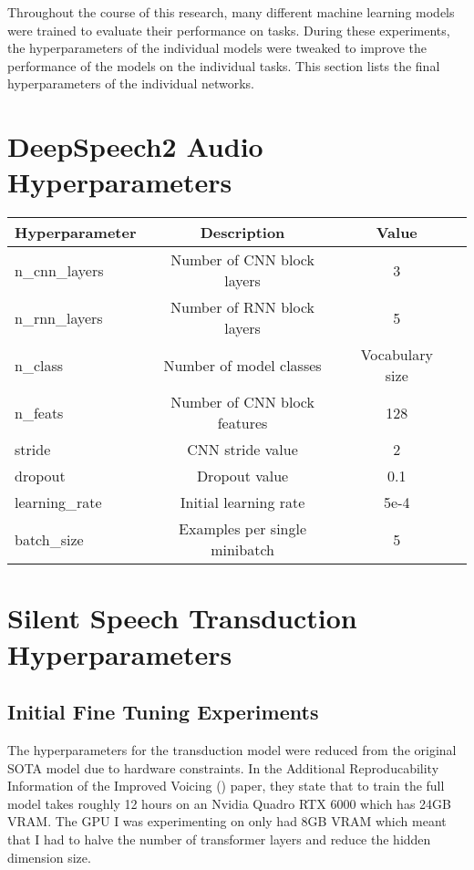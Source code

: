 Throughout the course of this research, many different machine learning models were
trained to evaluate their performance on tasks. During these experiments,
the hyperparameters of the individual models were tweaked to improve the performance of
the models on the individual tasks. This section lists the final hyperparameters of
the individual networks.

\section{DeepSpeech2 Audio Hyperparameters}


{\small\begin{center}
\begin{tabular} { | l | c | c | c | }
\hline
Hyperparameter & Description & Value \\
\hline
n\_cnn\_layers & Number of CNN block layers & 3 \\
n\_rnn\_layers & Number of RNN block layers & 5 \\
n\_class & Number of model classes & Vocabulary size \\
n\_feats & Number of CNN block features & 128 \\
stride & CNN stride value & 2 \\
dropout & Dropout value & 0.1 \\
learning\_rate & Initial learning rate & 5e-4 \\
batch\_size & Examples per single minibatch & 5 \\
\hline
\end{tabular}
\end{center}}

\section{Silent Speech Transduction Hyperparameters}

\subsection{Initial Fine Tuning Experiments}

The hyperparameters for the transduction model were reduced from the original
SOTA model due to hardware constraints. In the Additional Reproducability
Information of the Improved Voicing (\cite{gaddy2021improved}) paper, they state
that to train the full model takes roughly 12 hours on an Nvidia Quadro RTX 6000
which has 24GB VRAM. The GPU I was experimenting on only had 8GB VRAM which meant
that I had to halve the number of transformer layers and reduce the hidden dimension
size.

